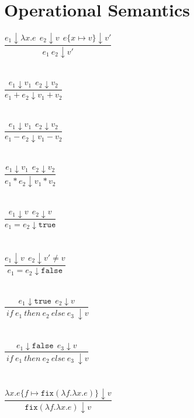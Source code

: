 \documentclass{westhesis}
\begin{document}
\section{Operational Semantics} 
$\dfrac{e_1 \downarrow \lambda x.e \ \ e_2 \downarrow v \ \ e\{x \mapsto v\} \downarrow v'}{e_1 \ e_2 \downarrow v'}$ \\ \\ \\
$\dfrac{e_1 \downarrow v_1 \ \ e_2 \downarrow v_2}{e_1 + e_2 \downarrow v_1 + v_2}$ \\ \\ \\
$\dfrac{e_1 \downarrow v_1 \ \ e_2 \downarrow v_2}{e_1 - e_2 \downarrow v_1 - v_2}$ \\ \\ \\
$\dfrac{e_1 \downarrow v_1 \ \ e_2 \downarrow v_2}{e_1 * e_2 \downarrow v_1 * v_2}$ \\ \\ \\
$\dfrac{e_1 \downarrow v \ \ e_2 \downarrow v}{e_1 = e_2 \downarrow \texttt{true}}$ \\ \\ \\
$\dfrac{e_1 \downarrow v \ \ e_2 \downarrow v' \neq v}{e_1 = e_2 \downarrow \texttt{false}}$ \\ \\ \\
$\dfrac{e_1 \downarrow \texttt{true} \ \ e_2 \downarrow v}{\ if \ e_1 \ then \ e_2 \ else \ e_3 \ \downarrow v}$ \\ \\ \\
$\dfrac{e_1 \downarrow \texttt{false} \ \ e_3 \downarrow v}{\ if \ e_1 \ then \ e_2 \ else \ e_3 \ \downarrow v}$ \\ \\ \\
$\dfrac{\lambda x.e\{ f \mapsto \texttt{fix}(\lambda f.\lambda x.e)\} \downarrow v}{\texttt{fix} (\lambda f.\lambda x.e) \downarrow 
v}$
\end{document}
